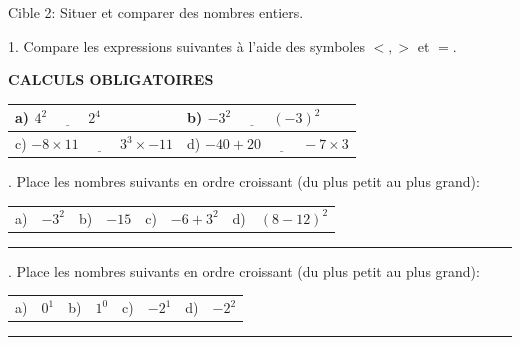 \documentclass[11pt]{article}
\begin{document}
\begin{cible}{Cible 2: Situer et comparer des nombres entiers.}

1. Compare les expressions suivantes à l'aide des symboles $<, >$ et $=$. 

\vspace{1cm}

\textbf{CALCULS OBLIGATOIRES}

\vspace{1cm}

\begin{tabular}{|p{7.7cm}|p{7.7cm}|}
\hline
\rule{0pt}{4mm} a) $4^2 \; \underline{\hspace{1cm}} \; 2^4$                     &               b) $-3^2 \; \underline{\hspace{1cm}} \; (-3)^2$           \\[3.2cm]
\hline
\rule{0pt}{4mm} c) $-8 \times 11 \; \underline{\hspace{1cm}} \; 3^3 \times -11$ &               d) $-40 + 20 \; \underline{\hspace{1cm}} \; -7 \times 3$ \\[3.2cm]
\hline
\end{tabular}



\vspace{6mm}
. Place les nombres  suivants en ordre croissant (du plus petit au plus grand): 

\vspace{2mm}
\begin{tabular}{@{}p{0.5cm}p{3cm}p{0.5cm}p{3.5cm}p{0.5cm}p{3cm}p{0.5cm}p{3cm}@{}}
a) & $-3^2$ & b) & $-15$ & c) & $-6 + 3^2$ & d) & $(8-12)^2$ \\
\end{tabular}

\vspace{1cm}

\noindent\rule{15cm}{0.4pt}

\vspace{6mm}
. Place les nombres  suivants en ordre croissant (du plus petit au plus grand): 

\vspace{2mm}
\begin{tabular}{@{}p{0.5cm}p{3cm}p{0.5cm}p{3.5cm}p{0.5cm}p{3cm}p{0.5cm}p{3cm}@{}}
a) & $0^1$ & b) & $1^0$ & c) & $-2^1$ & d) & $-2^2$ \\
\end{tabular}

\vspace{1cm}

\noindent\rule{15cm}{0.4pt}

\end{cible}
\end{document}

